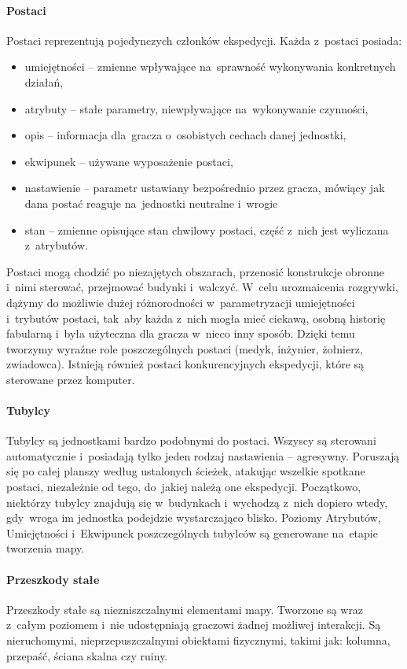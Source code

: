\documentclass[licencjacka]{pracamgr}
\begin{document}
      \paragraph{Postaci}
      	Postaci reprezentują pojedynczych członków ekspedycji. Każda z~postaci posiada:
      	\begin{itemize}
      	  \item umiejętności -- zmienne wpływające na~sprawność wykonywania konkretnych działań,
      	  \item atrybuty -- stałe parametry, niewpływające na~wykonywanie czynności,
	        \item opis -- informacja dla~gracza o~osobistych cechach danej jednostki,
          \item ekwipunek -- używane wyposażenie postaci,
          \item nastawienie -- parametr ustawiany bezpośrednio przez gracza, mówiący jak dana postać reaguje na~jednostki
          neutralne i~wrogie
	        \item stan -- zmienne opisujące stan chwilowy postaci, część z~nich jest wyliczana z~atrybutów.
      	\end{itemize}
      	Postaci mogą chodzić po niezajętych obszarach, przenosić konstrukcje obronne i~nimi sterować,	przejmować budynki
      	i~walczyć. W~celu urozmaicenia rozgrywki, dążymy do możliwie dużej różnorodności w~parametryzacji	umiejętności
      	i~trybutów postaci, tak~aby każda z~nich mogła mieć ciekawą, osobną historię fabularną i~była użyteczna
      	dla gracza w~nieco inny sposób. Dzięki temu tworzymy wyraźne role poszczególnych postaci (medyk, inżynier,
      	żołnierz,	zwiadowca).	Istnieją również postaci konkurencyjnych ekspedycji, które są sterowane przez komputer.
      \paragraph{Tubylcy}
        Tubylcy są jednostkami bardzo podobnymi do postaci. Wszyscy są sterowani automatycznie i~posiadają tylko jeden
        rodzaj nastawienia -- agresywny. Poruszają się po całej planszy według ustalonych ścieżek, atakując wszelkie
        spotkane postaci, niezależnie od tego, do~jakiej należą one ekspedycji. Początkowo, niektórzy tubylcy znajdują się
        w~budynkach i~wychodzą z~nich dopiero wtedy, gdy~wroga im jednostka podejdzie wystarczająco blisko. Poziomy
        Atrybutów, Umiejętności i~Ekwipunek poszczególnych tubylców są generowane na~etapie tworzenia mapy.
      \paragraph{Przeszkody stałe}
        Przeszkody stałe są niezniszczalnymi elementami mapy. Tworzone są wraz z~całym poziomem i~nie udostępniają graczowi
        żadnej możliwej interakcji. Są nieruchomymi, nieprzepuszczalnymi obiektami fizycznymi, takimi jak: kolumna,
        przepaść, ściana skalna czy ruiny.
\end{document}
